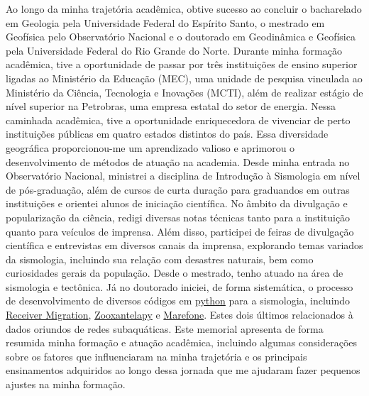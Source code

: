 \documentclass[10pt,a4paper,oneside]{book}
\begin{document}
Ao longo da minha trajetória acadêmica, obtive sucesso ao concluir o bacharelado em Geologia pela Universidade Federal do Espírito Santo, o mestrado em Geofísica pelo Observatório Nacional e o doutorado em Geodinâmica e Geofísica pela Universidade Federal do Rio Grande do Norte. Durante minha formação acadêmica, tive a oportunidade de passar por três instituições de ensino superior ligadas ao Ministério da Educação (MEC), uma unidade de pesquisa vinculada ao Ministério da Ciência, Tecnologia e Inovações (MCTI), além de realizar estágio de nível superior na Petrobras, uma empresa estatal do setor de energia. Nessa caminhada acadêmica, tive a oportunidade enriquecedora de vivenciar de perto instituições públicas em quatro estados distintos do país. Essa diversidade geográfica proporcionou-me um aprendizado valioso e aprimorou o desenvolvimento de métodos de atuação na academia. Desde minha entrada no Observatório Nacional, ministrei a disciplina de Introdução à Sismologia em nível de pós-graduação, além de cursos de curta duração para graduandos em outras instituições e orientei alunos de iniciação científica. No âmbito da divulgação e popularização da ciência, redigi diversas notas técnicas tanto para a instituição quanto para veículos de imprensa. Além disso, participei de feiras de divulgação científica e entrevistas em diversos canais da imprensa, explorando temas variados da sismologia, incluindo sua relação com desastres naturais, bem como curiosidades gerais da população. Desde o mestrado, tenho atuado na área de sismologia e tectônica. Já no doutorado iniciei, de forma sistemática, o processo de desenvolvimento de diversos códigos em \href{https://www.python.org/}{python} para a sismologia, incluindo \href{https://github.com/dIOGOLOC/codes_escritos/tree/master/mantle_transition_zone_migration_obspy_Pds}{Receiver Migration}, \href{https://zooxantelapy.readthedocs.io/en/latest/}{Zooxantelapy} e \href{https://github.com/dIOGOLOC/marefone/wiki}{Marefone}. Estes dois últimos relacionados à dados oriundos de redes subaquáticas. Este memorial apresenta de forma resumida minha formação e atuação acadêmica, incluindo algumas considerações sobre os fatores que influenciaram na minha trajetória e os principais ensinamentos adquiridos ao longo dessa jornada que me ajudaram fazer pequenos ajustes na minha formação.
\end{document}
